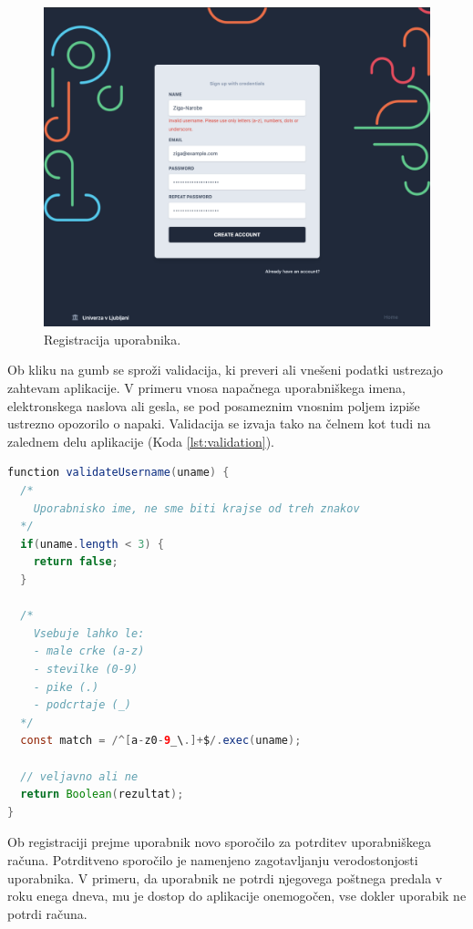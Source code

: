 \documentclass[a4paper, 12pt]{book}
\begin{document}
\begin{figure}[h]
\begin{center}
\includegraphics[width=1\textwidth]{slike/signup-validation.png}
\end{center}
\caption{ Registracija uporabnika. }
\label{signup-form}
\end{figure}

Ob kliku na gumb  se sproži validacija, ki preveri ali vnešeni podatki ustrezajo zahtevam aplikacije. V primeru vnosa napačnega uporabniškega imena, elektronskega naslova ali gesla, se pod posameznim vnosnim poljem izpiše ustrezno opozorilo o napaki. Validacija se izvaja tako na čelnem kot tudi na zalednem delu aplikacije (Koda \ref{lst:validation}). 


\begin{lstlisting}[language=java, style=mystyle,caption={Primer validacijske funkcije za preverjanje uporabniškega imena z uporabo regularnega izraza},label=lst:validation]
function validateUsername(uname) {
  /*
    Uporabnisko ime, ne sme biti krajse od treh znakov
  */
  if(uname.length < 3) {
    return false;
  }

  /* 
    Vsebuje lahko le: 
    - male crke (a-z) 
    - stevilke (0-9)
    - pike (.)
    - podcrtaje (_)
  */
  const match = /^[a-z0-9_\.]+$/.exec(uname);
  
  // veljavno ali ne
  return Boolean(rezultat);
}
\end{lstlisting}

Ob registraciji prejme uporabnik novo sporočilo za potrditev uporabniškega računa. Potrditveno sporočilo je namenjeno zagotavljanju verodostonjosti uporabnika. V primeru, da uporabnik ne potrdi njegovega poštnega predala v roku enega dneva, mu je dostop do aplikacije onemogočen, vse dokler uporabik ne potrdi računa.
\end{document}
